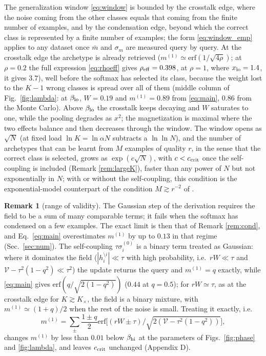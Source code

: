 \documentclass{SciPost}
\theoremstyle{plain}
\theoremstyle{definition}
\newtheorem{remark}{Remark}
\newcommand{\erf}{\mathrm{erf}}
\begin{document}
The generalization window \eqref{eq:window} is bounded by the crosstalk edge, where the noise coming from the other classes equals that coming from the finite number of examples, and by the condensation edge, beyond which the correct class is represented by a finite number of examples; the form \eqref{eq:window_emp} applies to any dataset once $\bar m$ and $\sigma_m$ are measured query by query. At the crosstalk edge the archetype is already retrieved ($m^{(1)}\simeq\erf(1/\sqrt{4\rho})$; at $\rho=0.2$ the full expression \eqref{eq:rhoeff} gives $\rho_{\rm eff}=0.398$, at $\rho=1$, where $x_{\rm lo}=1.4$, it gives $3.7$), well before the softmax has selected its class, because the weight lost to the $K-1$ wrong classes is spread over all of them (middle column of Fig.\ \ref{fig:lambda}: at $\beta_{\rm lo}$, $W=0.19$ and $m^{(1)}=0.89$ from \eqref{eq:main}, $0.86$ from the Monte Carlo). Above $\beta_{\rm lo}$ the crosstalk keeps decaying and $W$ saturates to one, while the pooling degrades as $x^2$; the magnetization is maximal where the two effects balance and then decreases through the window. The window opens as $\sqrt N$ (at fixed load $\ln K=\ln\alpha N$ subtracts a $\ln\ln N$), and the number of archetypes that can be learnt from $M$ examples of quality $r$, in the sense that the correct class is selected, grows as $\exp(c\sqrt N)$, with $c<c_{\rm crit}$ once the self-coupling is included (Remark \ref{rem:largeK}), faster than any power of $N$ but not exponentially in $N$; with or without the self-coupling, this condition is the exponential-model counterpart of the condition $M\gtrsim r^{-2}$ of \cite{Alemanno2023}.

\begin{remark}[range of validity]\label{rem:limits}
The Gaussian step of the derivation requires the field to be a sum of many comparable terms; it fails when the softmax has condensed on a few examples. The exact limit is then that of Remark \ref{rem:cond}, and Eq.\ \eqref{eq:main} overestimates $m^{(1)}$ by up to $0.13$ in that regime (Sec.\ \ref{sec:num}). The self-coupling $\tau\sigma^{(0)}_i$ is a binary term treated as Gaussian: where it dominates the field ($|h^{\setminus i}_i|\ll\tau$ with high probability, i.e.\ $rW\ll\tau$ and $\mathcal V-\tau^2(1-q^2)\ll\tau^2$) the update returns the query and $m^{(1)}=q$ exactly, while \eqref{eq:main} gives $\erf(q/\sqrt{2(1-q^2)})$ ($0.44$ at $q=0.5$); for $rW\simeq\tau$, as at the crosstalk edge for $K\gtrsim K_\times$, the field is a binary mixture, with $m^{(1)}\simeq(1+q)/2$ when the rest of the noise is small. Treating it exactly, i.e.\
\begin{equation*}
m^{(1)}=\sum_\pm\frac{1\pm q}{2}\erf\big[(rW\pm\tau)/\sqrt{2(\mathcal V-\tau^2(1-q^2))}\big],
\end{equation*}
changes $m^{(1)}$ by less than $0.01$ below $\beta_{\rm hi}$ at the parameters of Figs.\ \ref{fig:phase} and \ref{fig:lambda}, and leaves $c_{\rm crit}$ unchanged (Appendix D).
\end{remark}
\end{document}
